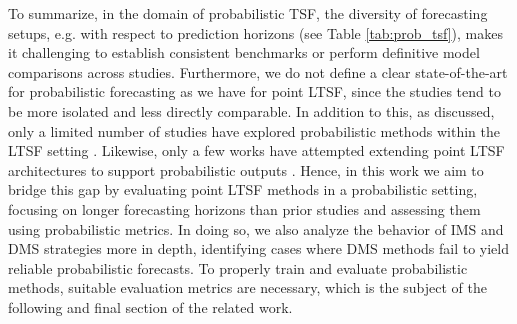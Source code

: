 \documentclass[a4paper,oneside,bibliography=totoc]{scrbook}
\begin{document}
\noindent
To summarize, in the domain of probabilistic TSF, the diversity of forecasting setups, e.g. with respect to prediction horizons (see Table \ref{tab:prob_tsf}), makes it challenging to establish consistent benchmarks or perform definitive model comparisons across studies.
Furthermore, we do not define a clear state-of-the-art for probabilistic forecasting as we have for point LTSF, since the studies tend to be more isolated and less directly comparable.
In addition to this, as discussed, only a limited number of studies have explored probabilistic methods within the LTSF setting \cite{alcaraz_diffusion-based_2022, bergsma_sutranets_2023, liu_retrieval-augmented_2024}.
Likewise, only a few works have attempted extending point LTSF architectures to support probabilistic outputs \cite{rasul_vq-tr_2023, li_transformer-modulated_2023, koochali_if_2021}.
Hence, in this work we aim to bridge this gap by evaluating point LTSF methods in a probabilistic setting, focusing on longer forecasting horizons than prior studies and assessing them using probabilistic metrics. 
In doing so, we also analyze the behavior of IMS and DMS strategies more in depth, identifying cases where DMS methods fail to yield reliable probabilistic forecasts.
To properly train and evaluate probabilistic methods, suitable evaluation metrics are necessary, which is the subject of the following and final section of the related work.

\end{document}
